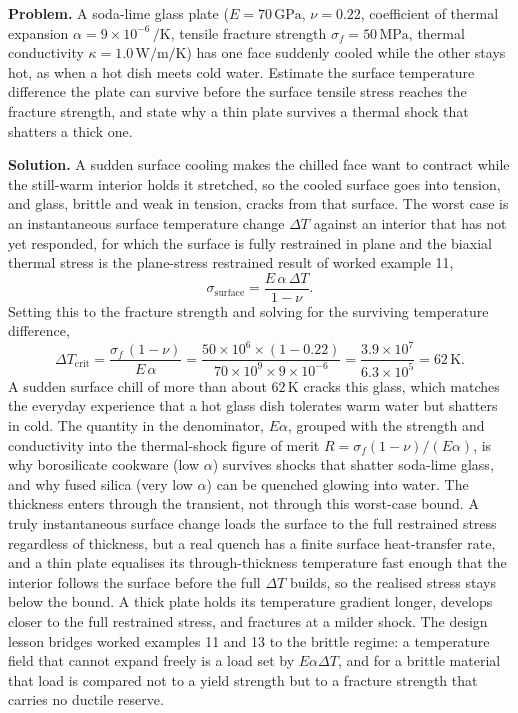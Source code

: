 \textbf{Problem.} A soda-lime glass plate ($E = 70\,\text{GPa}$, $\nu = 0.22$,
coefficient of thermal expansion $\alpha = 9\times 10^{-6}\,\si{\per\kelvin}$,
tensile fracture strength $\sigma_f = 50\,\text{MPa}$, thermal conductivity
$\kappa = 1.0\,\si{\watt\per\meter\per\kelvin}$) has one face suddenly cooled
while the other stays hot, as when a hot dish meets cold water. Estimate the
surface temperature difference the plate can survive before the surface
tensile stress reaches the fracture strength, and state why a thin plate
survives a thermal shock that shatters a thick one.

\textbf{Solution.} A sudden surface cooling makes the chilled face want to
contract while the still-warm interior holds it stretched, so the cooled
surface goes into tension, and glass, brittle and weak in tension, cracks from
that surface. The worst case is an instantaneous surface temperature change
$\Delta T$ against an interior that has not yet responded, for which the
surface is fully restrained in plane and the biaxial thermal stress is the
plane-stress restrained result of worked example 11,
\[
\sigma_{\text{surface}} = \frac{E\,\alpha\,\Delta T}{1-\nu}.
\]
Setting this to the fracture strength and solving for the surviving
temperature difference,
\[
\Delta T_{\text{crit}} = \frac{\sigma_f\,(1-\nu)}{E\,\alpha}
= \frac{50\times 10^6\times (1-0.22)}{70\times 10^9\times 9\times 10^{-6}}
= \frac{3.9\times 10^7}{6.3\times 10^5}
= 62\,\si{\kelvin}.
\]
A sudden surface chill of more than about $62\,\si{\kelvin}$ cracks this
glass, which matches the everyday experience that a hot glass dish tolerates
warm water but shatters in cold. The quantity in the denominator, $E\alpha$,
grouped with the strength and conductivity into the thermal-shock figure of
merit $R = \sigma_f(1-\nu)/(E\alpha)$, is why borosilicate cookware (low
$\alpha$) survives shocks that shatter soda-lime glass, and why fused silica
(very low $\alpha$) can be quenched glowing into water. The thickness enters
through the transient, not through this worst-case bound. A truly instantaneous
surface change loads the surface to the full restrained stress regardless of
thickness, but a real quench has a finite surface heat-transfer rate, and a
thin plate equalises its through-thickness temperature fast enough that the
interior follows the surface before the full $\Delta T$ builds, so the realised
stress stays below the bound. A thick plate holds its temperature gradient
longer, develops closer to the full restrained stress, and fractures at a
milder shock. The design lesson bridges worked examples 11 and 13 to the
brittle regime: a temperature field that cannot expand freely is a load set by
$E\alpha\Delta T$, and for a brittle material that load is compared not to a
yield strength but to a fracture strength that carries no ductile reserve.

